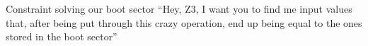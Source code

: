 \begin{frame}{Constraint solving our boot sector}
    ``Hey, Z3, I want you to find me input values that, after being put through
    this crazy operation, end up being equal to the ones stored in the boot
    sector''
    \\
    \begin{center}
    \end{center}
\end{frame}

\begin{comment}

\begin{frame}{Irreversible transforms and hash functions}
    \framesubtitle{It's only sort of magic}
    \begin{itemize}
        \item<1-> Hash functions are usually defined as
                  $H(s, x) \rightarrow \{0, 1\}^\ell$, where $s$ is the 'seed',
                  $x$ is the message, and $\ell$ is some fixed number of bits
        \item<2-> The 'seed' is some public value used to initialize the hash
                  function's state
        \item<3-> There are a series of repeated 'reductions' meant to take the
                  message and perform some sort of irreversible transform on it
                  one block at a time
    \end{itemize}
    \begin{block}<4->{Example}
        For SHA256, $s$ is the fractional part of the cube roots of the first
        64 primes, $\ell = 256$, and the reductions involve a few non-linear
        functions (i.e. addition/XOR of multiple values, taking the majority of
        three bits, etc). The idea is that {\em you can't get the original
        message back once you start scrambling it.}
    \end{block}
\end{frame}

\begin{frame}{But, this is a CTF\ldots}
    \begin{itemize}
        \item<1-> They wouldn't hash the flag with a strong hash function and
                  expect us to break it
        \item<2-> The hash function has to fit in 512 bytes of x86 instructions
        \item<3-> So\ldots{} we can expect that we have to reverse engineer the
                  hash function to recover the flag
    \end{itemize}
\end{frame}
\end{comment}
